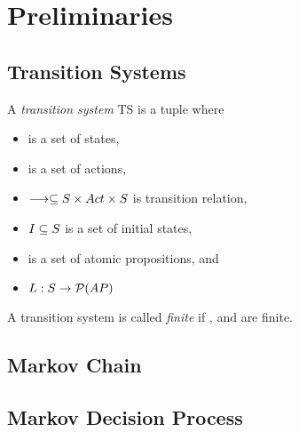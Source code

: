 \documentclass[preview]{standalone}
\begin{document}
	
\section{Preliminaries}

\subsection{Transition Systems}


\begin{definition}
	A \emph{transition system} TS is a tuple \transitionsystem where
	\begin{itemize}
		\item \states is a set of states,
		\item \actions is a set of actions,
		\item $\longrightarrow \subseteq S \times Act \times S$ is transition relation,
		\item $I \subseteq S$ is a set of initial states,
		\item \atomicprops is a set of atomic propositions, and
		\item $L : S \rightarrow \mathcal{P}(AP)$
	\end{itemize}
\end{definition}

A transition system is called \emph{finite} if \states, \atomicprops and  are finite.

\subsection{Markov Chain}

\subsection{Markov Decision Process} 

	
\end{document}
